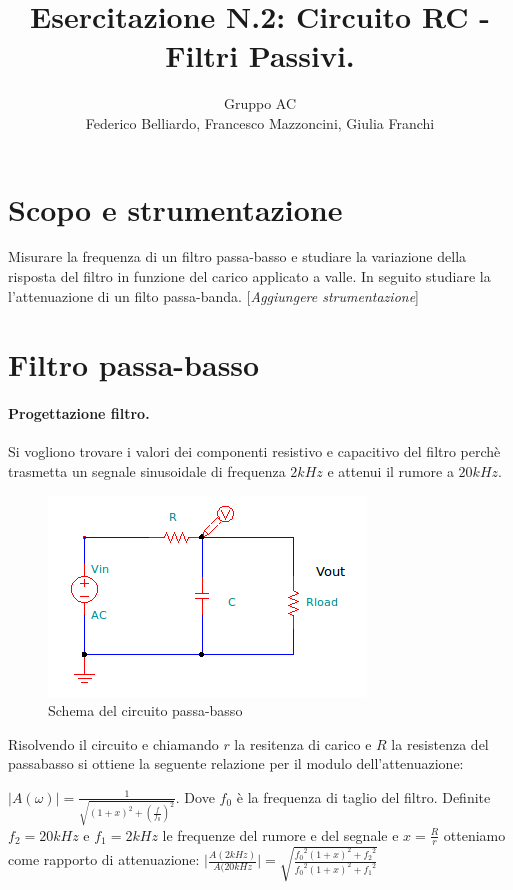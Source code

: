 \documentclass[10pt,a4paper]{article}
\author{Gruppo AC \\ Federico Belliardo, Francesco Mazzoncini, Giulia Franchi}
\title{Esercitazione N.2: Circuito RC - Filtri Passivi.}
\newcommand{\rem}[1]{[\emph{#1}]}
\begin{document}
\maketitle

\section{Scopo e strumentazione}

Misurare la frequenza di un filtro passa-basso e studiare la variazione della risposta del filtro in funzione del carico applicato a valle. In seguito studiare la l'attenuazione di un filto passa-banda.
\rem{Aggiungere strumentazione}

\section{Filtro passa-basso}

\paragraph{Progettazione filtro.}
Si vogliono trovare i valori dei componenti resistivo e capacitivo del filtro perchè trasmetta un segnale sinusoidale di frequenza $2kHz$ e attenui il rumore a $20kHz$.

\begin{figure}[h]
\centering
\includegraphics{passabasso.png}
\caption{Schema del circuito passa-basso}
\end{figure}

Risolvendo il circuito e chiamando $r$ la resitenza di carico e $R$ la resistenza del passabasso si ottiene la seguente relazione per il modulo dell'attenuazione:

$\vert A(\omega) \vert = \frac{1}{\sqrt{(1+x)^2+(\frac{f}{f_{0}})^2}} $. Dove $f_0$ è la frequenza di taglio del filtro. Definite $f_2 = 20 kHz$ e $f_1 = 2 kHz$ le frequenze del rumore e del segnale e $x = \frac {R}{r}$ otteniamo come rapporto di attenuazione:
$\vert \frac{A(2 kHz)}{A(20 kHz} \vert = \sqrt{\frac{{f_0}^2 (1+x)^2 + {f_2}^2}{{f_0}^2 (1+x)^2 + {f_1}^2}}$
\end{document}
